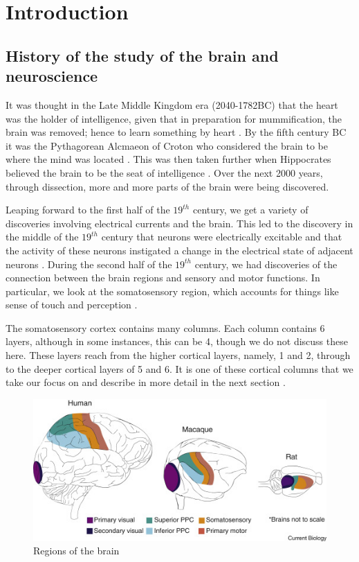 \section{Introduction}
\subsection{History of the study of the brain and neuroscience}
It was thought in the Late Middle Kingdom era (2040-1782BC) that the heart was the holder of intelligence, given that in preparation for mummification, the brain was removed; hence to learn something by heart \cite{dintroduction}. By the fifth century BC it was the Pythagorean Alcmaeon of Croton who considered the brain to be where the mind was located \cite{inbook}. This was then taken further when Hippocrates believed the brain to be the seat of intelligence \cite{finger2001origins}. Over the next 2000 years, through dissection, more and more parts of the brain were being discovered. 

Leaping forward to the first half of the $19^{th}$ century, we get a variety of discoveries  involving electrical currents and the brain. This led to the discovery in the middle of the $19^{th}$ century that neurons were electrically excitable and that the activity of these neurons instigated a change in the electrical state of adjacent neurons \cite{2013}. During the second half of the $19^{th}$ century, we had discoveries of the connection between the brain regions and sensory and motor functions. In particular, we look at the somatosensory region, which accounts for things like sense of touch and perception \cite{2005}. 

The somatosensory cortex contains many columns. Each column contains 6 layers, although in some instances, this can be 4, though we do not discuss these here. These layers reach from the higher cortical layers, namely, 1 and 2, through to the deeper cortical layers of 5 and 6. It is one of these cortical columns that we take our focus on and describe in more detail in the next section \cite{Reimann_2017}.
\begin{figure}[H]
\begin{center}
\captionsetup{justification=centering}
\includegraphics[width=12cm]{graph/brain.jpg}
\caption{Regions of the brain  \cite{Whitlock2017PosteriorPC}}
\end{center}
\end{figure}
